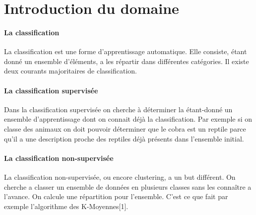 \section{Introduction du domaine}
\paragraph{La classification}

La classification est une forme d’apprentissage automatique. Elle consiste,
étant donné un ensemble d’éléments, a les répartir dans différentes catégories. Il existe
deux courants majoritaires de classification.

\paragraph{La classification supervisée}


Dans la classification supervisée on cherche à déterminer la
étant-donné un ensemble d’apprentissage dont on connait déjà la classification. Par
exemple si on classe des animaux on doit pouvoir déterminer que le cobra est un
reptile parce qu’il a une description proche des reptiles déjà présents dans l’ensemble
initial.

\paragraph{La classification non-supervisée}

La classification non-supervisée, ou encore clustering, a un but différent. On
cherche a classer un ensemble de données en plusieurs classes sans les connaître a
l’avance. On calcule une répartition pour l’ensemble. C’est ce que fait par exemple
l’algorithme des K-Moyennes[1].



\newpage